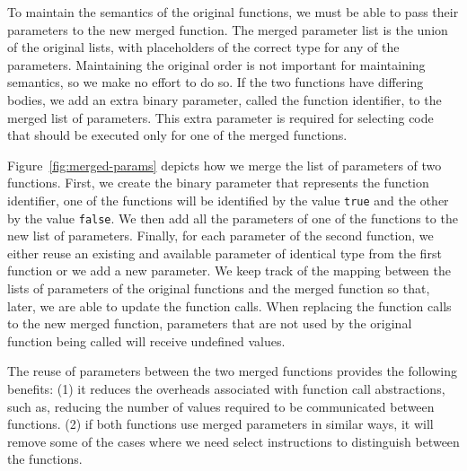 
To maintain the semantics of the original functions, we must be able to pass their parameters to
the new merged function. The merged parameter list is the union of the original lists, with
placeholders of the correct type for any of the parameters. Maintaining the original order is not
important for maintaining semantics, so we make no effort to do so.
If the two functions have differing bodies, we add an extra binary parameter, called the function
identifier, to the merged list of parameters. This extra parameter is required for selecting code
that should be executed only for one of the merged functions.

Figure~\ref{fig:merged-params} depicts
how we merge the list of parameters of two functions.
First, we create the binary parameter that represents the function identifier,
one of the functions will be identified by the value \texttt{true} and the other
by the value \texttt{false}.
We then add all the parameters of one of the functions to the new list of
parameters.
Finally, for each parameter of the second function, we either reuse an existing
and available parameter of identical type from the first function or we add a
new parameter.
We keep track of the mapping between the lists of parameters of the
original functions and the merged function so that, later, we are able to
update the function calls.
When replacing the function calls to the new merged function, parameters that
are not used by the original function being called will receive undefined values.

The reuse of parameters between the two merged functions provides the following
benefits:
(1) it reduces the overheads associated with function call abstractions, such as,
reducing the number of values required to be communicated between functions.
(2) if both functions use merged parameters in similar ways, it will remove some
of the cases where we need select instructions to distinguish between the functions.

